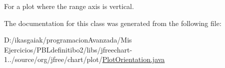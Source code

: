For a plot where the range axis is vertical. 

The documentation for this class was generated from the following file\+:\begin{DoxyCompactItemize}
\item 
D\+:/ikasgaiak/programacion\+Avanzada/\+Mis Ejercicios/\+P\+B\+Ldefinitibo2/libs/jfreechart-\/1../source/org/jfree/chart/plot/\mbox{\hyperlink{_plot_orientation_8java}{Plot\+Orientation.\+java}}\end{DoxyCompactItemize}
